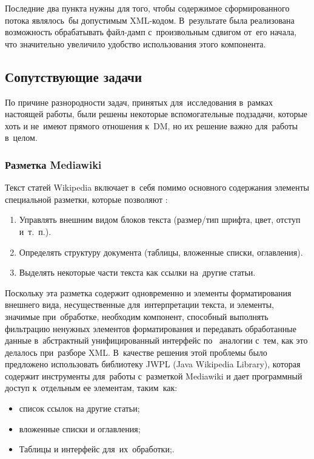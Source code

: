 Последние два пункта нужны для того, чтобы содержимое сформированного потока являлось~бы допустимым XML-кодом.
В~результате была реализована возможность обрабатывать файл-дамп с~произвольным сдвигом от~его начала, 
что значительно увеличило удобство использования этого компонента.  

\subsection{Сопутствующие задачи}

По причине разнородности задач, принятых для~исследования в~рамках настоящей работы,
были решены некоторые вспомогательные подзадачи, которые хоть и не~имеют прямого отношения к~DM, 
но их решение важно для~работы в~целом.

\subsubsection{Разметка Mediawiki}
\label{sec:wiki_markup}

Текст статей Wikipedia включает в~себя помимо основного содержания элементы специальной разметки, которые позволяют \cite{wikimarkup}:

\begin{enumerate}

\item{Управлять внешним видом блоков текста (размер/тип шрифта, цвет, отступ и~т.~п.).}
\item{Определять структуру документа (таблицы, вложенные списки, оглавления).}
\item{Выделять некоторые части текста как ссылки на~другие статьи.}

\end{enumerate}

Поскольку эта разметка содержит одновременно и элементы форматирования внешнего вида,
несущественные для~интерпретации текста, и элементы, значимые при~обработке,
необходим компонент, способный выполнять фильтрацию ненужных элементов форматирования
и передавать обработанные данные в~абстрактный унифицированный интерфейс 
по~ аналогии с~тем, как это делалось при~разборе XML.
В~качестве решения этой проблемы было предложено использовать библиотеку 
JWPL (Java Wikipedia Library)\cite{jwpl}, 
которая содержит инструменты для~работы с~разметкой Mediawiki\cite{wikimarkup} 
и дает программный доступ к~отдельным ее элементам, таким~как:

\begin{itemize}

\item {список ссылок на другие статьи;}
\item{вложенные списки и оглавления;}
\item{Таблицы и интерфейс для~их~обработки;.}

\end{itemize}

